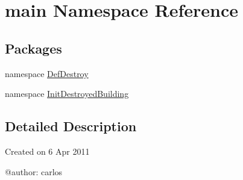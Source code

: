 \hypertarget{namespacemain}{\section{main Namespace Reference}
\label{namespacemain}
}
\subsection*{Packages}
\begin{DoxyCompactItemize}
\item 
namespace \hyperlink{namespacemain_1_1_def_destroy}{Def\-Destroy}
\item 
namespace \hyperlink{namespacemain_1_1_init_destroyed_building}{Init\-Destroyed\-Building}
\end{DoxyCompactItemize}


\subsection{Detailed Description}
\begin{DoxyVerb}Created on 6 Apr 2011

@author: carlos
\end{DoxyVerb}
 